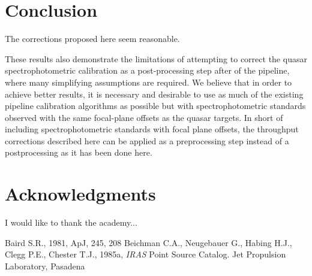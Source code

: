 \documentclass[useAMS,usenatbib]{mn2e}
\begin{document}
\section{Conclusion}

The corrections proposed here seem reasonable.

These results also demonstrate the limitations of attempting to correct the quasar spectrophotometric calibration as a post-processing step after of the pipeline, where many simplifying assumptions are required. We believe that in order to achieve better results, it is necessary and desirable to use as much of the existing pipeline calibration algorithms as possible but with spectrophotometric standards observed with the same focal-plane offsets as the quasar targets. In short of including spectrophotometric standards with focal plane offsets, the throughput corrections described here can be applied as a preprocessing step instead of a postprocessing as it has been done here.


\section*{Acknowledgments}

I would like to thank the academy...

\begin{thebibliography}{99}
 Baird S.R., 1981,
ApJ, 245, 208
 Beichman
C.A., Neugebauer G., Habing H.J., Clegg P.E., Chester T.J., 1985a,
{\it IRAS\/} Point Source Catalog. Jet Propulsion Laboratory,
Pasadena
\end{thebibliography}

\bsp

\label{lastpage}
\end{document}
